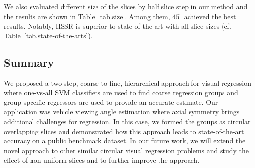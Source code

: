 \documentclass{tutmscthesis}[2010/09/22]
\numberwithin{equation}{section}
\numberwithin{table}{section}
\numberwithin{figure}{section}
\begin{document}
\vspace{\medskipamount} 
\begin{table}[th]
  \caption{Evaluation on the circular slice size. }
\centering
{}\label{tab.size} 
\end{table}
We also evaluated different size of the slices by half slice step in our method and
the results are shown in Table~\ref{tab.size}. Among
them, $45^\circ$ achieved the best results. Notably, HSSR is
superior to state-of-the-art with all slice sizes (cf.
Table~\ref{tab.state-of-the-arts}).


\subsection{Summary}
We proposed a two-step, coarse-to-fine, hierarchical approach for visual regression where one-vs-all SVM classifiers are used to find coarse regression groups and group-specific regressors are used to provide an accurate estimate. Our application was vehicle viewing angle estimation where axial symmetry brings additional challenges for regression. In this case, we formed the groups as circular overlapping slices and demonstrated how this approach leads to state-of-the-art accuracy on a public benchmark dataset. In our future work, we will extend the novel approach to other similar circular visual regression problems and study the effect of non-uniform slices and to further improve the approach.
\end{document}
